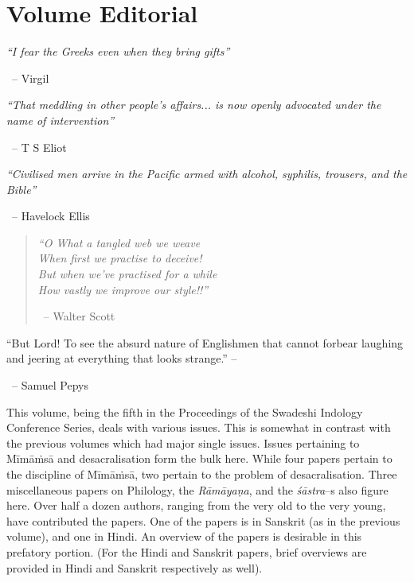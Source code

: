 
\chapter*{Volume Editorial}\label{volumeeditorial}

\begin{myquote}
\textit{“I fear the Greeks even when they bring gifts”} 

~\hfill – Virgil
\end{myquote}

\begin{myquote}
\textit{“That meddling in other people’s affairs... is now openly advocated under the name of intervention”} 

~\hfill – T S Eliot
\end{myquote}

\begin{myquote}
\textit{“Civilised men arrive in the Pacific armed with alcohol, syphilis, trousers, and the Bible”} 

~\hfill – Havelock Ellis
\end{myquote}

\begin{verse}
\textit{“O What a tangled web we weave\\ When first we practise to deceive!\\ But when we’ve practised for a while\\ How vastly we improve our style!!”} 

~\hfill – Walter Scott
\end{verse}

\begin{myquote}
“But Lord! To see the absurd nature of Englishmen that cannot forbear laughing and jeering at everything that looks strange.” – 

~\hfill – Samuel Pepys
\end{myquote}

This volume, being the fifth in the Proceedings of the Swadeshi Indology Conference Series, deals with various issues. This is somewhat in contrast with the previous volumes which had major single issues. Issues pertaining to Mīmāṁsā and desacralisation form the bulk here. While four papers pertain to the discipline of Mīmāṁsā, two pertain to the problem of desacralisation. Three miscellaneous papers on Philology, the \textit{Rāmāyaṇa}, and the \textit{śāstra}–s also figure here. Over half a dozen authors, ranging from the very old to the very young, have contributed the papers. One of the papers is in Sanskrit (as in the previous volume), and one in Hindi. An overview of the papers is desirable in this prefatory portion. (For the Hindi and Sanskrit papers, brief overviews are provided in Hindi and Sanskrit respectively as well).

